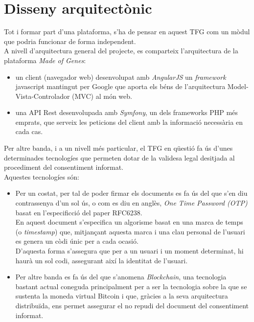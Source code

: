\section{Disseny arquitectònic}
Tot i formar part d'una plataforma, s'ha de pensar en aquest TFG com un mòdul que podria funcionar de forma independent.\\
\newline A nivell d'arquitectura general del projecte, es comparteix l'arquitectura de la plataforma \textit{Made of Genes}:
	\begin{itemize}
		\item un client (navegador web) desenvolupat amb \textit{AngularJS}\cite{angular} un \textit{framework} javascript mantingut per Google que aporta els béns de l'arquitectura Model-Vista-Controlador (MVC\cite{mvc}) al món web.
		\item una API\cite{api} Rest\cite{rest} desenvolupada amb \textit{Symfony}\cite{symfony}, un dels frameworks PHP més emprats, que serveix les peticions del client amb la informació necessària en cada cas.
	\end{itemize}
Per altre banda, i a un nivell més particular, el TFG en qüestió fa ús d'unes determinades tecnologíes que permeten dotar de la validesa legal desitjada al procediment del consentiment informat.\\
Aquestes tecnologíes són:
\begin{itemize}
	\item Per un costat, per tal de poder firmar els documents es fa ús del que s'en diu contrassenya d'un sol ús, o com es diu en anglès, \textit{One Time Password (OTP)} basat en l'especificció del paper RFC6238\cite{otp}. \\En aquest document s'especifica un algorisme basat en una marca de temps (o \textit{timestamp}) que, mitjançant aquesta marca i una clau personal de l'usuari es genera un còdi únic per a cada ocasió. \\ \newline D'aquesta forma s'assegura que per a un usuari i un moment determinat, hi haurà un sol codi, assegurant així la identitat de l'usuari.
	\item Per altre banda es fa ús del que s'anomena \textit{Blockchain}\cite{blockchain}, una tecnologia bastant actual coneguda principalment per a ser la tecnologia sobre la que se sustenta la moneda virtual Bitcoin i que, gràcies a la seva arquitectura distribuïda, ens permet assegurar el no repudi del document del consentiment informat.
\end{itemize}
